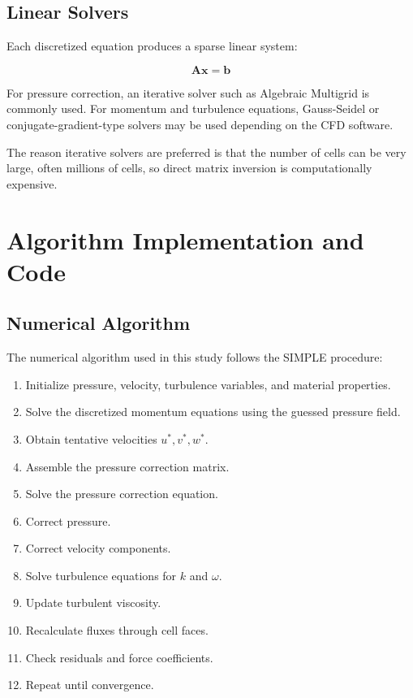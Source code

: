 \documentclass[12pt,a4paper]{article}
\begin{document}
\subsection{Linear Solvers}

Each discretized equation produces a sparse linear system:

\begin{equation}
    \bm{A}\bm{x} = \bm{b}
\end{equation}

For pressure correction, an iterative solver such as Algebraic Multigrid is commonly used. For momentum and turbulence equations, Gauss-Seidel or conjugate-gradient-type solvers may be used depending on the CFD software.

The reason iterative solvers are preferred is that the number of cells can be very large, often millions of cells, so direct matrix inversion is computationally expensive.


\section{Algorithm Implementation and Code}

\subsection{Numerical Algorithm}

The numerical algorithm used in this study follows the SIMPLE procedure:

\begin{enumerate}
    \item Initialize pressure, velocity, turbulence variables, and material properties.
    \item Solve the discretized momentum equations using the guessed pressure field.
    \item Obtain tentative velocities \(u^*,v^*,w^*\).
    \item Assemble the pressure correction matrix.
    \item Solve the pressure correction equation.
    \item Correct pressure.
    \item Correct velocity components.
    \item Solve turbulence equations for \(k\) and \(\omega\).
    \item Update turbulent viscosity.
    \item Recalculate fluxes through cell faces.
    \item Check residuals and force coefficients.
    \item Repeat until convergence.
\end{enumerate}
\end{document}
